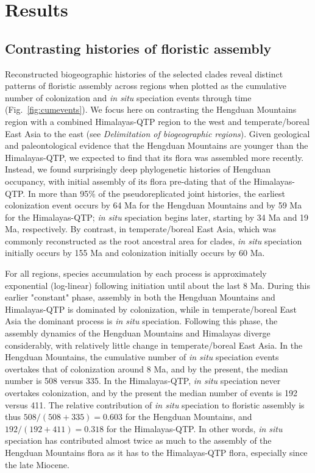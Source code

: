 \section*{Results}

\subsection*{Contrasting histories of floristic assembly}

Reconstructed biogeographic histories of the selected clades reveal
distinct patterns of floristic assembly across regions when plotted as
the cumulative number of colonization and \textit{in situ} speciation
events through time (Fig.~\ref{fig:cumevents}). We focus here on
contrasting the Hengduan Mountains region with a combined
Himalayas-QTP region to the west and temperate/boreal East Asia to the
east (see \textit{Delimitation of biogeographic regions}). Given
geological and paleontological evidence that the Hengduan Mountains
are younger than the Himalayas-QTP, we expected to find that its flora
was assembled more recently. Instead, we found surprisingly deep
phylogenetic histories of Hengduan occupancy, with initial assembly of
its flora pre-dating that of the Himalayas-QTP. In more than 95\% of
the pseudoreplicated joint histories, the earliest colonization event
occurs by 64 Ma for the Hengduan Mountains and by 59 Ma for the
Himalayas-QTP; \textit{in situ} speciation begins later, starting by
34 Ma and 19 Ma, respectively. By contrast, in temperate/boreal East
Asia, which was commonly reconstructed as the root ancestral area for
clades, \textit{in situ} speciation initially occurs by 155 Ma and
colonization initially occurs by 60 Ma.

For all regions, species accumulation by each process is approximately
exponential (log-linear) following initiation until about the last 8
Ma. During this earlier "constant" phase, assembly in both the
Hengduan Mountains and Himalayas-QTP is dominated by colonization,
while in temperate/boreal East Asia the dominant process is \textit{in
  situ} speciation. Following this phase, the assembly dynamics of the
Hengduan Mountains and Himalayas diverge considerably, with relatively
little change in temperate/boreal East Asia. In the Hengduan
Mountains, the cumulative number of \textit{in situ} speciation events
overtakes that of colonization around 8 Ma, and by the present, the
median number is 508 versus 335. In the Himalayas-QTP, \textit{in
  situ} speciation never overtakes colonization, and by the present
the median number of events is 192 versus 411. The relative
contribution of \textit{in situ} speciation to floristic assembly is
thus $508/(508+335) = 0.603$ for the Hengduan Mountains, and
$192/(192+411) = 0.318$ for the Himalayas-QTP. In other words,
\textit{in situ} speciation has contributed almost twice as much to
the assembly of the Hengduan Mountains flora as it has to the
Himalayas-QTP flora, especially since the late Miocene.

